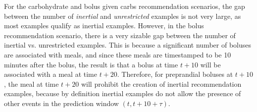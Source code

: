For the carbohydrate and bolus given carbs recommendation scenarios, the gap between the number of {\it inertial} and {\it unrestricted} examples is not very large, as most examples qualify as inertial examples. However, in the bolus recommendation scenario, there is a very sizable gap between the number of inertial vs. unrestricted examples. This is because a significant number of boluses are associated with meals, and since these meals are timestamped to be 10 minutes after the bolus, the result is that a bolus at time $t + 10$ will be associated with a meal at time $t + 20$. Therefore, for preprandial boluses at $t + 10$, the meal at time $t + 20$ will prohibit the creation of inertial recommendation examples, because by definition inertial examples do not allow the presence of other events in the prediction window $(t, t + 10 + \tau)$.

